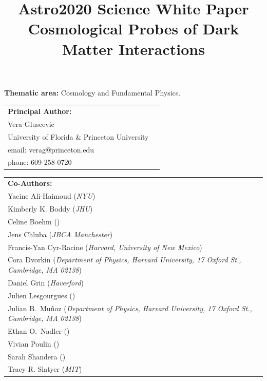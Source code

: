 \documentclass[12pt]{article}
\title{\textbf{Astro2020 Science White Paper}\\
\vspace{0.5cm}
Cosmological Probes of Dark Matter Interactions}
\date{}
\author{}
\begin{document}
\maketitle
\vspace{-2cm}
\begin{center}
\textbf{Thematic area:} Cosmology and Fundamental Physics.     
\end{center}
\vspace{0.5cm}

{\begin{tabular}{ll}
\textbf{Principal Author:} \\
Vera Gluscevic & \\
University of Florida \& Princeton University & \\
email: verag@princeton.edu\\
phone: 609-258-0720 & 
\end{tabular}

\vspace{0.5cm}
{\begin{tabular}{l}
\textbf{Co-Authors:}\\
Yacine Ali-Haimoud (\textit{NYU})\\
Kimberly K. Boddy (\textit{JHU})\\
Celine Boehm (\textit{})\\
Jens Chluba (\textit{JBCA Manchester})\\
Francis-Yan Cyr-Racine (\textit{Harvard, University of New Mexico})\\
Cora Dvorkin (\textit{Department of Physics, Harvard University, 17 Oxford St., Cambridge, MA 02138})\\
Daniel Grin (\textit{Haverford})\\
Julien Lesgourgues (\textit{})\\
Julian B.~Mu\~noz (\textit{Department of Physics, Harvard University, 17 Oxford St., Cambridge, MA 02138})\\
Ethan O.~Nadler (\textit{})\\
Vivian Poulin (\textit{})\\
Sarah Shandera (\textit{})\\
Tracy R. Slatyer (\textit{MIT})\\
\end{tabular}}
}
\vspace{7mm}
\end{document}
